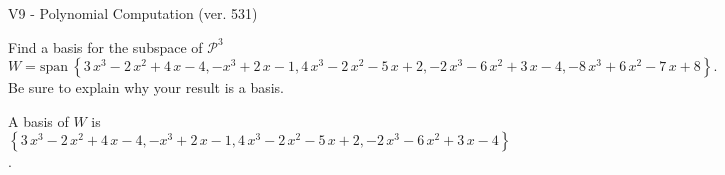\begin{exercise}
  \begin{exerciseTitle}V9 - Polynomial Computation (ver. 531)\end{exerciseTitle}
  \begin{exerciseStatement}
    Find a basis for the subspace of \(\mathcal{P}^3\) 
\[W=\mathrm{span}\ \left\{3 \, x^{3} - 2 \, x^{2} + 4 \, x - 4 , -x^{3} + 2 \, x - 1 , 4 \, x^{3} - 2 \, x^{2} - 5 \, x + 2 , -2 \, x^{3} - 6 \, x^{2} + 3 \, x - 4 , -8 \, x^{3} + 6 \, x^{2} - 7 \, x + 8\right\}.\]
 Be sure to explain why your result is a basis.


  \end{exerciseStatement}
  \begin{exerciseAnswer}
   A basis of \(W\) is  \(\left\{3 \, x^{3} - 2 \, x^{2} + 4 \, x - 4 , -x^{3} + 2 \, x - 1 , 4 \, x^{3} - 2 \, x^{2} - 5 \, x + 2 , -2 \, x^{3} - 6 \, x^{2} + 3 \, x - 4\right\}\).
  


  \end{exerciseAnswer}
\end{exercise}
